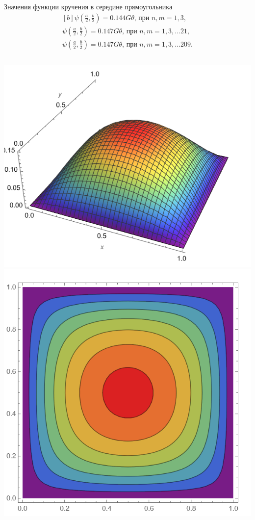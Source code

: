 \documentclass[ignoreonframetext,unicode]{beamer}
\begin{document}
\begin{frame}{}
	\begin{block}{Значения функции кручения в середине прямоугольника}	
	\[
		\begin{aligned}[b]
		\psi\left(\frac{a}{2}, \frac{b}{2}\right) = 0.144G\theta\mbox{, при } n, m = 1, 3, \\
		\psi\left(\frac{a}{2}, \frac{b}{2}\right) = 0.147G\theta\mbox{, при } n, m = 1, 3, \ldots21,\\
		\psi\left(\frac{a}{2}, \frac{b}{2}\right) = 0.147G\theta\mbox{, при } n, m = 1, 3, \ldots209.
	\end{aligned}
	\]
	\end{block}

	\begin{columns}
	\includegraphics[width=\textwidth]{ser_graph}%
	\includegraphics[width=\textwidth]{ser_levels}%
\end{columns}
\end{frame}
\end{document}

